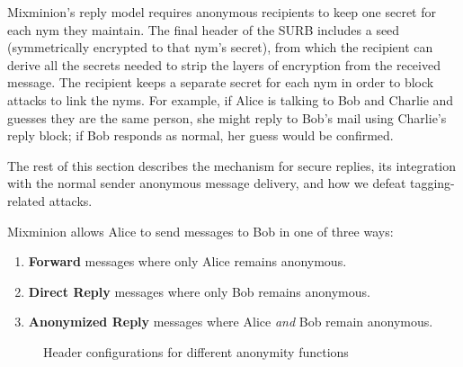 \documentclass[times,10pt,twocolumn]{article}
\begin{document}
Mixminion's reply model requires anonymous recipients to keep one secret
for each nym they maintain. The final header of the SURB includes a seed
(symmetrically encrypted to that nym's secret), from which the recipient
can derive all the secrets needed to strip the layers of encryption from
the received message. The recipient keeps a separate secret for each
nym in order to block attacks to link the nyms. For example, if Alice
is talking to Bob and Charlie and guesses they are the same person, she
might reply to Bob's mail using Charlie's reply block; if Bob responds
as normal, her guess would be confirmed.

The rest of this section describes the mechanism for secure replies,
its integration with the normal sender anonymous message delivery, and
how we defeat tagging-related attacks.  

\label{subsec:replies}
\label{subsec:header-swap}

Mixminion allows Alice to send messages to Bob in one of three ways:

\begin{enumerate}
\item \textbf{Forward} messages where only Alice remains anonymous.
\item \textbf{Direct Reply} messages where only Bob remains anonymous.
\item \textbf{Anonymized Reply} messages where Alice \emph{and} Bob
   remain anonymous.
\end{enumerate}

\begin{figure}
\begin{center}
\caption{Header configurations for different anonymity functions} 
\end{center}
\end{figure}
\end{document}
